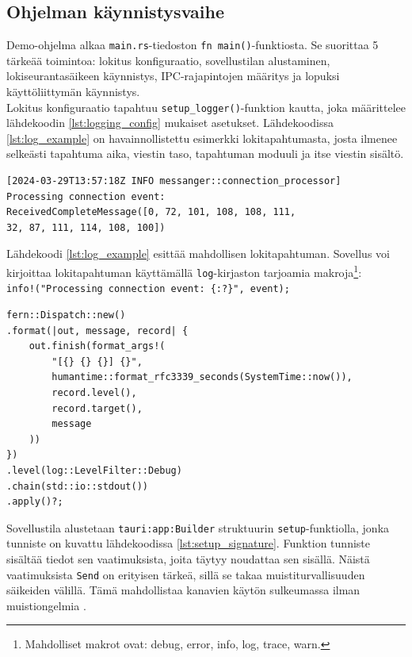 \documentclass[a4paper,12pt]{article}
\begin{document}
    \subsection{Ohjelman käynnistysvaihe}

    Demo-ohjelma alkaa \lstinline{main.rs}-tiedoston \lstinline{fn main()}-funktiosta.
    Se suorittaa 5 tärkeää toimintoa: lokitus
    konfiguraatio, sovellustilan alustaminen, lokiseurantasäikeen käynnistys, IPC-rajapintojen määritys ja lopuksi käyttöliittymän käynnistys. \\



    Lokitus konfiguraatio tapahtuu \lstinline{setup_logger()}-funktion kautta, joka määrittelee lähdekoodin \ref{lst:logging_config} mukaiset asetukset.
    Lähdekoodissa \ref{lst:log_example} on havainnollistettu esimerkki lokitapahtumasta, josta ilmenee selkeästi tapahtuma aika,
    viestin taso, tapahtuman moduuli ja itse viestin sisältö.

    \begin{lstlisting}[caption={Esimerkki lokitapahtumasta}, label={lst:log_example}]
[2024-03-29T13:57:18Z INFO messanger::connection_processor]
Processing connection event:
ReceivedCompleteMessage([0, 72, 101, 108, 108, 111,
32, 87, 111, 114, 108, 100])
    \end{lstlisting}
    
    Lähdekoodi \ref{lst:log_example} esittää mahdollisen lokitapahtuman. Sovellus voi kirjoittaa lokitapahtuman käyttämällä \lstinline{log}-kirjaston tarjoamia makroja\footnote{Mahdolliset makrot ovat: debug, error, info, log, trace, warn.}:\\ \lstinline|info!("Processing connection event: {:?}", event);|\par

    \begin{lstlisting}[caption={Lokituskonfiguraatio}, label={lst:logging_config}]
fern::Dispatch::new()
.format(|out, message, record| {
    out.finish(format_args!(
        "[{} {} {}] {}",
        humantime::format_rfc3339_seconds(SystemTime::now()),
        record.level(),
        record.target(),
        message
    ))
})
.level(log::LevelFilter::Debug)
.chain(std::io::stdout())
.apply()?;
    \end{lstlisting}


    Sovellustila alustetaan \lstinline{tauri:app:Builder} struktuurin \lstinline{setup}-funktiolla, jonka tunniste on kuvattu lähdekoodissa \ref{lst:setup_signature}. Funktion tunniste sisältää tiedot sen vaatimuksista, joita täytyy noudattaa sen sisällä. Näistä vaatimuksista \lstinline{Send} on erityisen tärkeä, sillä se takaa muistiturvallisuuden säikeiden välillä. Tämä mahdollistaa kanavien käytön sulkeumassa ilman muistiongelmia \cite[ch. 8.2]{rust-book}. \par
\end{document}
